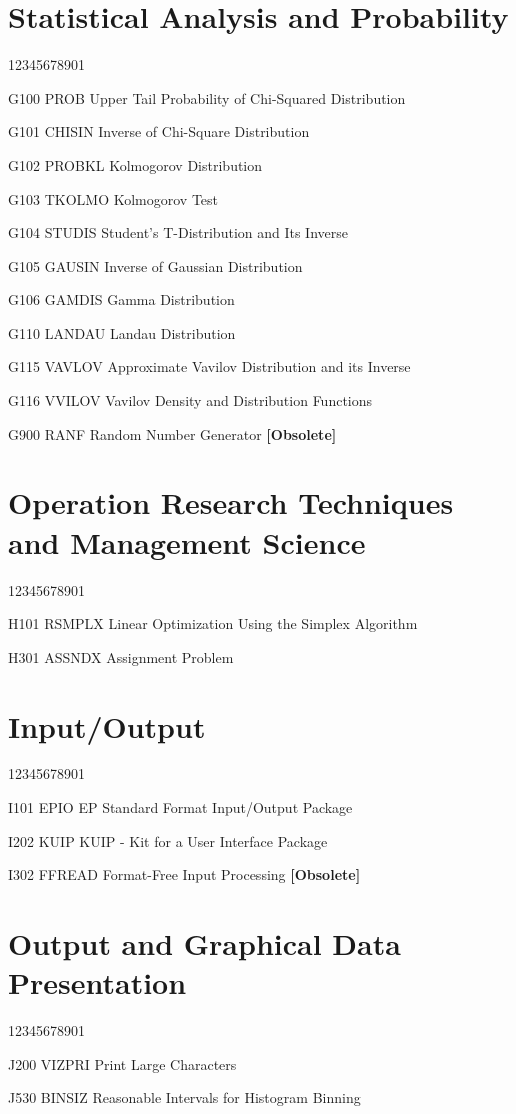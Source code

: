 \section*{Statistical Analysis and Probability}
\begin{DLtt}{12345678901}
\item[G100 PROB] Upper Tail Probability of Chi-Squared Distribution
\item[G101 CHISIN] Inverse of Chi-Square Distribution
\item[G102 PROBKL] Kolmogorov Distribution
\item[G103 TKOLMO] Kolmogorov Test
\item[G104 STUDIS] Student's T-Distribution and Its Inverse
\item[G105 GAUSIN] Inverse of Gaussian Distribution
\item[G106 GAMDIS] Gamma Distribution
\item[G110 LANDAU] Landau Distribution
\item[G115 VAVLOV] Approximate Vavilov Distribution and its Inverse
\item[G116 VVILOV] Vavilov Density and Distribution Functions
\item[G900 RANF] Random Number Generator {\bf [Obsolete]}
\end{DLtt}
\section*{Operation Research Techniques and Management Science}
\begin{DLtt}{12345678901}
\item[H101 RSMPLX] Linear Optimization Using the Simplex Algorithm
\item[H301 ASSNDX] Assignment Problem
\end{DLtt}
\section*{Input/Output}
\begin{DLtt}{12345678901}
\item[I101 EPIO] EP Standard Format Input/Output Package
\item[I202 KUIP] KUIP - Kit for a User Interface Package
\item[I302 FFREAD] Format-Free Input Processing {\bf [Obsolete]}
\end{DLtt}
\section*{Output and Graphical Data Presentation}
\begin{DLtt}{12345678901}
\item[J200 VIZPRI] Print Large Characters
\item[J530 BINSIZ] Reasonable Intervals for Histogram Binning
\end{DLtt}
